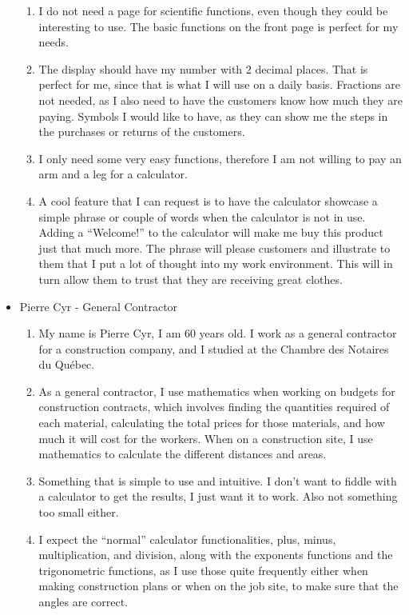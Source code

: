 \documentclass[titlepage]{article}
\begin{document}
\begin{itemize}
\begin{enumerate}
                            \item I do not need a page for scientific functions, even though they could be interesting to use. The basic functions on the front page is perfect for my needs.
                            \item The display should have my number with 2 decimal places. That is perfect for me, since that is what I will use on a daily basis. Fractions are not needed, as I also need to have the customers know how much they are paying. Symbols I would like to have, as they can show me the steps in the purchases or returns of the customers.
                            \item I only need some very easy functions, therefore I am not willing to pay an arm and a leg for a calculator.
                            \item A cool feature that I can request is to have the calculator showcase a simple phrase or couple of words when the calculator is not in use. Adding a “Welcome!” to the calculator will make me buy this product just that much more. The phrase will please customers and illustrate to them that I put a lot of thought into my work environment. This will in turn allow them to trust that they are receiving great clothes.
                        \end{enumerate}
                    \item Pierre Cyr - General Contractor
                        \begin{enumerate}
                            \item My name is Pierre Cyr, I am 60 years old. I work as a general contractor for a construction company, and I studied at the Chambre des Notaires du Québec.
                            \item As a general contractor, I use mathematics when working on budgets for construction contracts, which involves finding the quantities required of each material, calculating the total prices for those materials, and how much it will cost for the workers. When on a construction site, I use mathematics to calculate the different distances and areas.
                            \item Something that is simple to use and intuitive. I don’t want to fiddle with a calculator to get the results, I just want it to work. Also not something too small either.
                            \item I expect the “normal” calculator functionalities, plus, minus, multiplication, and division, along with the exponents functions and the trigonometric functions, as I use those quite frequently either when making construction plans or when on the job site, to make sure that the angles are correct.

\end{enumerate}
\end{itemize}
\end{document}
